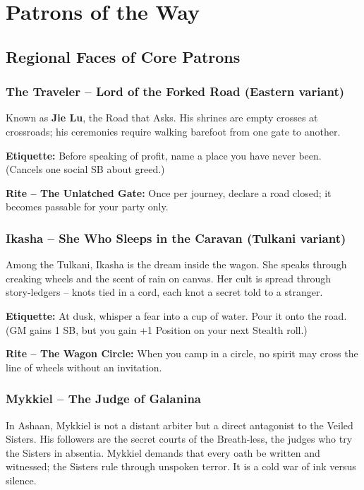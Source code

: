 \documentclass[11pt]{book}
\begin{document}
\clearpage
\chapter{Patrons of the Way}

\section{Regional Faces of Core Patrons}

\subsection{The Traveler – Lord of the Forked Road (Eastern variant)}
Known as \textbf{Jie Lu}, the Road that Asks. His shrines are empty crosses at crossroads; his ceremonies require walking barefoot from one gate to another.

\textbf{Etiquette:} Before speaking of profit, name a place you have never been. (Cancels one social SB about greed.)

\textbf{Rite -- The Unlatched Gate:} Once per journey, declare a road closed; it becomes passable for your party only.

\subsection{Ikasha – She Who Sleeps in the Caravan (Tulkani variant)}
Among the Tulkani, Ikasha is the dream inside the wagon. She speaks through creaking wheels and the scent of rain on canvas. Her cult is spread through story‑ledgers -- knots tied in a cord, each knot a secret told to a stranger.

\textbf{Etiquette:} At dusk, whisper a fear into a cup of water. Pour it onto the road. (GM gains 1 SB, but you gain +1 Position on your next Stealth roll.)

\textbf{Rite -- The Wagon Circle:} When you camp in a circle, no spirit may cross the line of wheels without an invitation.

\subsection{Mykkiel – The Judge of Galanina}
In Ashaan, Mykkiel is not a distant arbiter but a direct antagonist to the Veiled Sisters. His followers are the secret courts of the Breath‑less, the judges who try the Sisters in absentia. Mykkiel demands that every oath be written and witnessed; the Sisters rule through unspoken terror. It is a cold war of ink versus silence.
\end{document}
